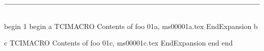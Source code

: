                       

%
%

$\rule[18pt]{474pt}{0.5pt}\vspace{-15pt}$

begin
1
begin
a
TCIMACRO
Contents of foo 01a, ms00001a.tex
EndExpansion
b
%

c
TCIMACRO
Contents of foo 01c, ms00001c.tex
EndExpansion
end
end
